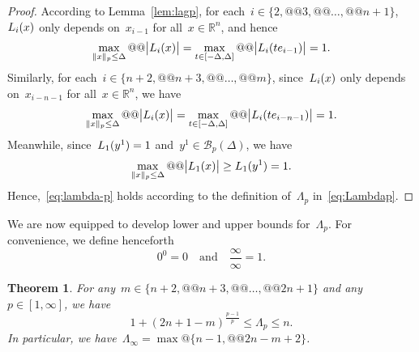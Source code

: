 \documentclass{article}
\numberwithin{equation}{section}
\theoremstyle{definition}
\theoremstyle{plain}
\newtheorem{theorem}{Theorem}[section]
\theoremstyle{remark}
\newcommand*{\abs}[2][]{#1\lvert#2#1\rvert}
\newcommand*{\norm}[2][]{#1\lVert#2#1\rVert}
\newcommand*{\set}[2][]{#1\{#2#1\}}
\newcommand*{\R}{\mathbb{R}}
\newcommand*{\lagp}[1][]{L\ifblank{#1}{}{_{#1}}}
\begin{document}
\begin{proof}
    According to Lemma~\ref{lem:lagp}, for each~$i \in \set{2, @@ 3, @@ \dots, @@ n + 1}$,~$\lagp[i](x)$ only depends on~$x_{i - 1}$ for all~$x \in \R^n$, and hence
    \begin{equation*}
        \max_{\norm{x}_p \le \Delta} @@ \abs[\big]{\lagp[i](x)} = \max_{t \in [-\Delta, \Delta]} @@ \abs[\big]{\lagp[i](t e_{i - 1})} = 1.
    \end{equation*}
    Similarly, for each~$i \in \set{n + 2, @@ n + 3, @@ \dots, @@ m}$, since~$\lagp[i](x)$ only depends on~$x_{i - n - 1}$ for all~$x \in \R^n$, we have
    \begin{equation*}
        \max_{\norm{x}_p \le \Delta} @@ \abs[\big]{\lagp[i](x)} = \max_{t \in [-\Delta, \Delta]} @@ \abs[\big]{\lagp[i](t e_{i - n - 1})} = 1.
    \end{equation*}
    Meanwhile, since~$\lagp[1](y^1) = 1$ and~$y^1 \in \mathcal{B}_p(\Delta)$, we have
    \begin{equation*}
        \max_{\norm{x}_p \le \Delta} @@ \abs[\big]{\lagp[1](x)} \ge \lagp[1](y^1) = 1.
    \end{equation*}
    Hence,~\eqref{eq:lambda-p} holds according to the definition of~$\Lambda_p$ in~\eqref{eq:Lambdap}.
\end{proof}

We are now equipped to develop lower and upper bounds for~$\Lambda_p$.
For convenience, we define henceforth
\begin{equation*}
    0^0 = 0 \quad \text{and} \quad \frac{\infty}{\infty} = 1.
\end{equation*}

\begin{theorem}
    \label{thm:bounds}
    For any~$m \in \set{n + 2, @@ n + 3, @@ \dots, @@ 2n + 1}$ and any~$p \in [1, \infty]$, we have
    \begin{equation}
        \label{eq:bounds}
        1 + (2n + 1 - m)^{\frac{p - 1}{p}} \le \Lambda_p \le n.
    \end{equation}
    In particular, we have~$\Lambda_{\infty} = \max @ \set{n - 1, @@ 2n - m + 2}$.
\end{theorem}
\end{document}
